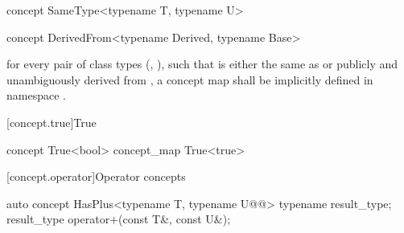 \documentclass[american,twoside]{book}
\begin{document}
\begin{itemdescr}
\pnum
{} 

\pnum
{}
\end{itemdescr}

\begin{itemdecl}
concept SameType<typename T, typename U> { }
\end{itemdecl}

\begin{itemdescr}
\pnum
{}
\end{itemdescr}

\begin{itemdecl}
concept DerivedFrom<typename Derived, typename Base> { }
\end{itemdecl}

\begin{itemdescr}
\pnum
\mbox{\requires}
for every pair of class types (\mbox{}, \mbox{}),
such that \mbox{} is either the same as or publicly and
unambiguously derived from \mbox{}, a concept map
\mbox{} shall be implicitly defined in namespace
\mbox{}.
\end{itemdescr}

[concept.true]{True}

\begin{itemdecl}
concept True<bool> { }
concept_map True<true> { }
\end{itemdecl}

\begin{itemdescr}
\pnum
{}

\pnum
{}
\end{itemdescr}

[concept.operator]{Operator concepts}
\begin{itemdecl}
auto concept HasPlus<typename T, typename U@@> {
  typename result_type;
  result_type operator+(const T&, const U&);
}
\end{itemdecl}
\end{document}
